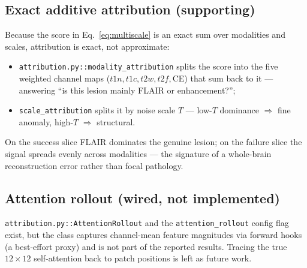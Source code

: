 \documentclass[11pt,a4paper]{article}
\newcommand{\code}[1]{\texttt{\small #1}}
\begin{document}
\subsection{Exact additive attribution (supporting)}
Because the score in Eq.~\eqref{eq:multiscale} is an exact sum over modalities
and scales, attribution is exact, not approximate:
\begin{itemize}[leftmargin=1.4em,itemsep=0pt]
\item \code{attribution.py::modality\_attribution} splits the score into the five
weighted channel maps ($t1n,t1c,t2w,t2f,$CE) that sum back to it --- answering
``is this lesion mainly FLAIR or enhancement?'';
\item \code{scale\_attribution} splits it by noise scale $T$ --- low-$T$ dominance
$\Rightarrow$ fine anomaly, high-$T$ $\Rightarrow$ structural.
\end{itemize}
On the success slice FLAIR dominates the genuine lesion; on the failure slice the
signal spreads evenly across modalities --- the signature of a whole-brain
reconstruction error rather than focal pathology.

\subsection{Attention rollout (wired, not implemented)}
\code{attribution.py::AttentionRollout} and the \code{attention\_rollout} config
flag exist, but the class captures channel-mean feature magnitudes via forward
hooks (a best-effort proxy) and is not part of the reported results. Tracing the
true $12\times12$ self-attention back to patch positions is left as future work.

\end{document}
